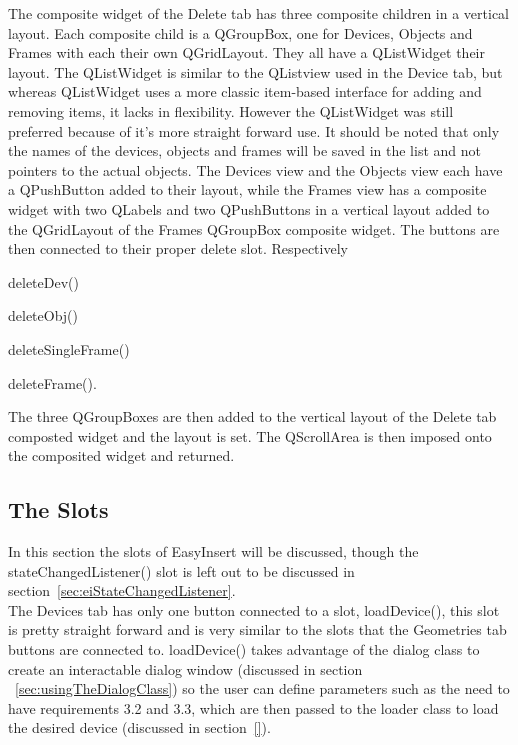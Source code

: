 The composite widget of the Delete tab has three composite children in a vertical layout. Each composite child is a QGroupBox, one for Devices, Objects and Frames with each their own QGridLayout. They all have a QListWidget their layout. The QListWidget is similar to the QListview used in the Device tab, but whereas QListWidget uses a more classic item-based interface for adding and removing items, it lacks in flexibility. However the QListWidget was still preferred because of it's more straight forward use. It should be noted that only the names of the devices, objects and frames will be saved in the list and not pointers to the actual objects. The Devices view and the Objects view each have a QPushButton added to their layout, while the Frames view has a composite widget with two QLabels and two QPushButtons in a vertical layout added to the QGridLayout of the Frames QGroupBox composite widget. The buttons are then connected to their proper delete slot. Respectively \begin{enumerate*}[font={\color{red!50!black}\bfseries}]
\item deleteDev()
\item deleteObj()
\item deleteSingleFrame()
\item deleteFrame().
\end{enumerate*} 
The three QGroupBoxes are then added to the vertical layout of the Delete tab composted widget and the layout is set. The QScrollArea is then imposed onto the composited widget and returned.

\subsection{The Slots}
\label{sec:eiSlots}
In this section the slots of EasyInsert will be discussed, though the stateChangedListener() slot is left out to be discussed in section~\ref{sec:eiStateChangedListener}.\\

The Devices tab has only one button connected to a slot, loadDevice(), this slot is pretty straight forward and is very similar to the slots that the Geometries tab buttons are connected to. loadDevice() takes advantage of the dialog class to create an interactable dialog window (discussed in section ~\ref{sec:usingTheDialogClass}) so the user can define parameters such as the need to have requirements 3.2 and 3.3, which are then passed to the loader class to load the desired device (discussed in section~\ref{}).\\


